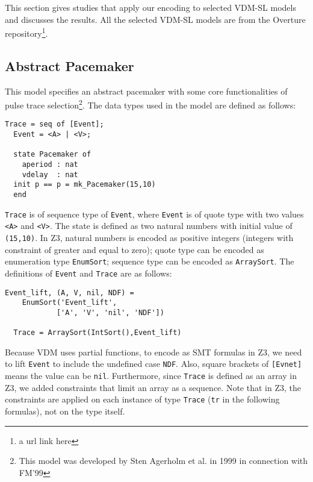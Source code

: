 This section gives studies that apply our encoding to selected VDM-SL models and discusses the results. All the selected VDM-SL models are from the Overture repository\footnote{a url link here}.

\subsection{Abstract Pacemaker}

This model specifies an abstract pacemaker with some core functionalities of pulse trace selection\footnote{This model was developed by Sten Agerholm et al. in 1999 in connection with FM'99}. The data types used in the model are defined as follows:

\begin{mdframed}[roundcorner=5pt]
\begin{Verbatim}[fontsize=\small]
  Trace = seq of [Event];
  Event = <A> | <V>;

  state Pacemaker of
    aperiod : nat 
    vdelay  : nat
  init p == p = mk_Pacemaker(15,10)
  end
\end{Verbatim}
\end{mdframed}

{\tt Trace} is of sequence type of {\tt Event}, where {\tt Event} is of quote type with two values {\tt <A>} and {\tt <V>}. The state is defined as two natural numbers with initial value of {\tt (15,10)}. In Z3, natural numbers is encoded as positive integers (integers with constraint of greater and equal to zero); quote type can be encoded as enumeration type {\tt EnumSort}; sequence type can be encoded as {\tt ArraySort}. The definitions of {\tt Event} and {\tt Trace} are as follows:

\begin{mdframed}[roundcorner=5pt,shadow=true]
\begin{Verbatim}[fontsize=\small]
  Event_lift, (A, V, nil, NDF) = 
    EnumSort('Event_lift', 
            ['A', 'V', 'nil', 'NDF'])

  Trace = ArraySort(IntSort(),Event_lift)
\end{Verbatim}
\end{mdframed}

Because VDM uses partial functions, to encode as SMT formulas in Z3, we need to lift {\tt Event} to include the undefined case {\tt NDF}. Also, square brackets of {\tt [Evnet]} means the value can be {\tt nil}. Furthermore, since {\tt Trace} is defined as an array in Z3, we added constraints that limit an array as a sequence. Note that in Z3, the constraints are applied on each instance of type {\tt Trace} ({\tt tr} in the following formulas), not on the type itself.

